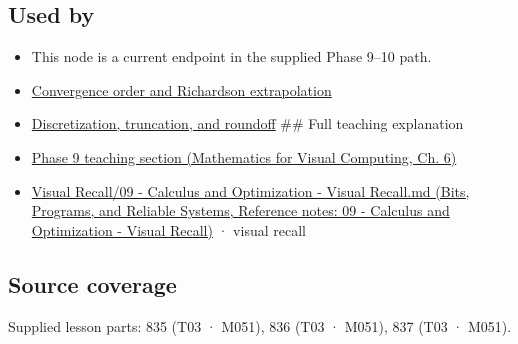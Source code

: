 \subsection{Used by}\label{appendix-80521eae6b71-used-by}

\hypertarget{appendix-80521eae6b71-used-by}{}

\begin{itemize}
\item
  This node is a current endpoint in the supplied Phase 9--10 path.
\item
  \hyperref[appendix-aca80b6bf17a]{Convergence order and Richardson extrapolation}
\item
  \hyperref[appendix-6b0648b2b8e8]{Discretization, truncation, and roundoff} \#\# Full teaching explanation
\item
  \href{../02-Mathematics-for-Visual-Computing/main.pdf\#nameddest=02-foundations-ii-ch022-integration-and-quadrature}{Phase 9 teaching section (Mathematics for Visual Computing, Ch. 6)}
\item
  \href{../01-Bits-Programs-and-Reliable-Systems/main.pdf\#nameddest=appendix-adf48f5dc5c1}{Visual Recall/09 - Calculus and Optimization - Visual Recall.md (Bits, Programs, and Reliable Systems, Reference notes: 09 - Calculus and Optimization - Visual Recall)} · visual recall
\end{itemize}

\subsection{Source coverage}\label{appendix-80521eae6b71-source-coverage}

\hypertarget{appendix-80521eae6b71-source-coverage}{}

Supplied lesson parts: 835 (T03 · M051), 836 (T03 · M051), 837 (T03 · M051).

